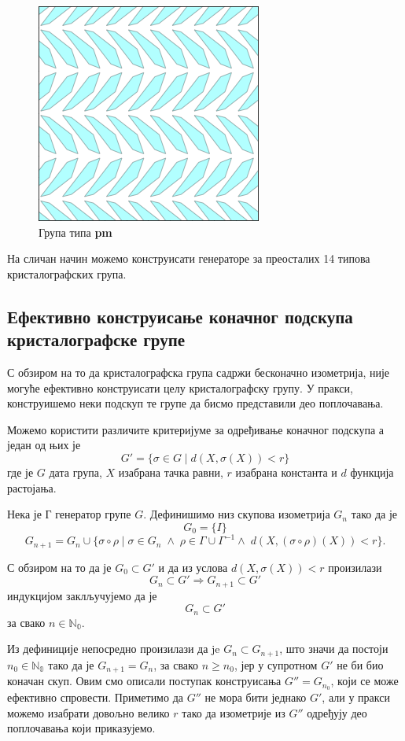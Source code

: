 \documentclass[12pt]{article}
\begin{document}
\begin{figure}[H]
\centering
    \includegraphics[width=.3\textwidth]{plavo_p3.png}
  
    \caption{Група типа \textbf{pm}}
      \label{fig:plavopm}
  \end{figure}



На сличан начин можемо конструисати генераторе за преосталих 14 типова кристалографских група.

\subsection{Ефективно конструисање коначног подскупа кристалографске групе}

С обзиром на то да кристалографска група садржи бесконачно изометрија, није могуће ефективно конструисати целу кристалографску групу. У пракси, конструишемо неки подскуп те групе да  бисмо представили део поплочавања.

Можемо користити различите критеријуме за одређивање коначног подскупа а један од њих је $$G' = \{\sigma \in G \;|\; d(X,\sigma(X)) < r\} $$ где је $G$ дата група, $X$ изабрана тачка равни, $r$ изабрана константа и $d$ функција растојања.

Нека је Г генератор групе $G$. Дефинишимо низ скупова изометрија $G_n$ тако да је $$G_0 = \{I\}$$
$$G_{n+1} = G_n \cup \{\sigma \circ \rho \;|\; \sigma \in G_n\; \wedge \; \rho \in \Gamma \cup \Gamma^{-1} \wedge \; d(X,(\sigma \circ \rho)(X)) < r \}. $$

С обзиром на то да је $G_0 \subset G'$ и да из услова $d(X,\sigma(X)) < r$ произилази 
$$G_n \subset G' \Rightarrow G_{n+1} \subset G'$$ индукцијом заклључујемо да је $$G_n \subset G'$$ за свако $n \in \mathbb{N_0}.$

Из дефиниције непосредно произилази да je $G_n \subset G_{n+1}$, што значи да постоји \\ $n_0\in \mathbb{N_0}$ тако да је $G_{n+1} = G_n$, за свако $n\geq n_0$, јер у супротном $G'$ не би био коначан скуп. Овим смо описали поступак конструисања $G''= G_{n_0}$, који се може ефективно спровести. Приметимо да $G''$ не мора бити једнако $G'$, али у пракси можемо изабрати довољно велико $r$ тако да  изометрије из $G''$ одређују део поплочавања који приказујемо. 
\end{document}
